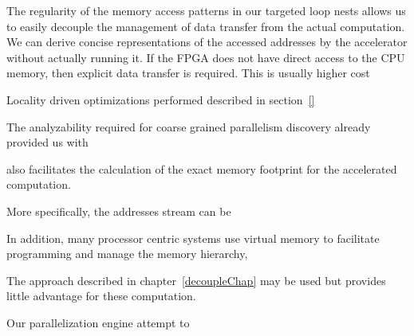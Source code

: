 The regularity of the memory access patterns in our targeted loop nests
allows us to easily decouple the management of data transfer from the actual computation.
We can derive concise representations of the accessed addresses by the accelerator without actually running it. 
If the FPGA does not have direct access to the CPU memory, then explicit
data transfer is required. This is usually higher cost






Locality driven optimizations performed
described in section~\ref{}




The analyzability required for coarse grained parallelism discovery 
already provided us with 

also
facilitates the calculation of the exact memory footprint for the accelerated computation. 


More specifically, the addresses stream can be 




In addition, many processor centric systems 
use virtual memory to facilitate programming and manage the memory hierarchy, 






The approach described in chapter~\ref{decoupleChap} may be used but provides little advantage for these computation. 






 



Our parallelization engine attempt to  

